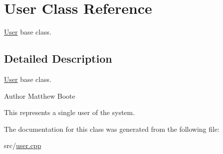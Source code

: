 \hypertarget{classUser}{}\section{User Class Reference}
\label{classUser}


\hyperlink{classUser}{User} base class.  




\subsection{Detailed Description}
\hyperlink{classUser}{User} base class. 

\begin{DoxyAuthor}{Author}
Matthew Boote
\end{DoxyAuthor}
This represents a single user of the system. 

The documentation for this class was generated from the following file\+:\begin{DoxyCompactItemize}
\item 
src/\hyperlink{user_8cpp}{user.\+cpp}\end{DoxyCompactItemize}
